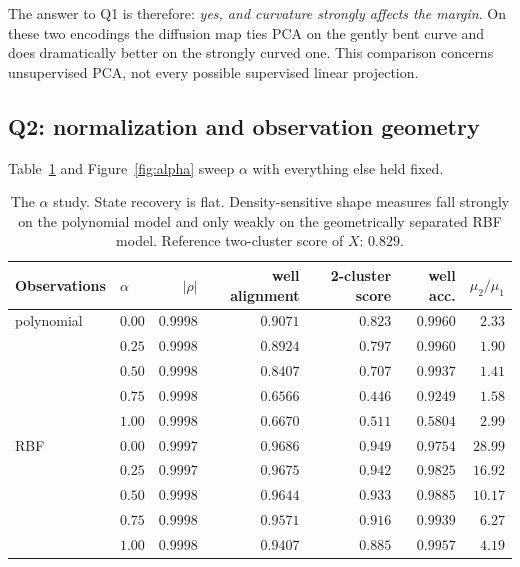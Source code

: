 \documentclass[11pt]{article}
\begin{document}
The answer to Q1 is therefore: \emph{yes, and curvature strongly affects the
margin}. On these two encodings the diffusion map ties PCA on the gently bent
curve and does dramatically better on the strongly curved one. This comparison
concerns unsupervised PCA, not every possible supervised linear projection.

\subsection{Q2: normalization and observation geometry}
\label{sec:res-alpha}

Table~\ref{tab:alpha} and Figure~\ref{fig:alpha} sweep $\alpha$ with everything
else held fixed.

\begin{table}[t]
\centering
\caption{The $\alpha$ study. State recovery is flat. Density-sensitive shape
measures fall strongly on the polynomial model and only weakly on the
geometrically separated RBF model. Reference two-cluster score of $X$: $0.829$.}
\label{tab:alpha}
\begin{tabular}{@{}llrrrrr@{}}
\toprule
Observations & $\alpha$ & $\lvert\rho\rvert$ & well alignment & 2-cluster score
& well acc. & $\mu_2/\mu_1$ \\
\midrule
polynomial & $0.00$ & $0.9998$ & $0.9071$ & $0.823$ & $0.9960$ & $2.33$ \\
           & $0.25$ & $0.9998$ & $0.8924$ & $0.797$ & $0.9960$ & $1.90$ \\
           & $0.50$ & $0.9998$ & $0.8407$ & $0.707$ & $0.9937$ & $1.41$ \\
           & $0.75$ & $0.9998$ & $0.6566$ & $0.446$ & $0.9249$ & $1.58$ \\
           & $1.00$ & $0.9998$ & $0.6670$ & $0.511$ & $\mathbf{0.5804}$ & $2.99$ \\
\midrule
RBF        & $0.00$ & $0.9997$ & $0.9686$ & $0.949$ & $0.9754$ & $28.99$ \\
           & $0.25$ & $0.9997$ & $0.9675$ & $0.942$ & $0.9825$ & $16.92$ \\
           & $0.50$ & $0.9998$ & $0.9644$ & $0.933$ & $0.9885$ & $10.17$ \\
           & $0.75$ & $0.9998$ & $0.9571$ & $0.916$ & $0.9939$ & $6.27$ \\
           & $1.00$ & $0.9998$ & $0.9407$ & $0.885$ & $0.9957$ & $4.19$ \\
\bottomrule
\end{tabular}
\end{table}
\end{document}
